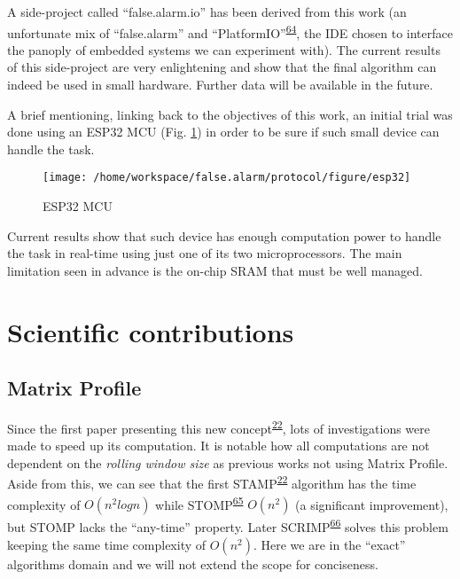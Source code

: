 \documentclass[12pt,twoside]{fmupthesis}
\begin{document}
A side-project called ``false.alarm.io'' has been derived from this work (an unfortunate mix of
``false.alarm'' and ``PlatformIO''\textsuperscript{\protect\hyperlink{ref-PlatformIO}{64}}, the IDE chosen to interface the panoply of embedded
systems we can experiment with). The current results of this side-project are very enlightening and
show that the final algorithm can indeed be used in small hardware. Further data will be available
in the future.

A brief mentioning, linking back to the objectives of this work, an initial trial was done using an
ESP32 MCU (Fig. \ref{fig:esp32}) in order to be sure if such small device can handle the task.
\begin{figure}

{\centering \texttt{[image: /home/workspace/false.alarm/protocol/figure/esp32]} 

}

\caption{ESP32 MCU}\label{fig:esp32}
\end{figure}
Current results show that such device has enough computation power to handle the task in real-time
using just one of its two microprocessors. The main limitation seen in advance is the on-chip SRAM
that must be well managed.

\hypertarget{scientific-contributions}{%
\chapter{Scientific contributions}\label{scientific-contributions}}

\hypertarget{matrix-profile}{%
\section{Matrix Profile}\label{matrix-profile}}

Since the first paper presenting this new concept\textsuperscript{\protect\hyperlink{ref-Yeh2017a}{22}}, lots of investigations were made to
speed up its computation. It is notable how all computations are not dependent on the \emph{rolling
window size} as previous works not using Matrix Profile. Aside from this, we can see that the first
STAMP\textsuperscript{\protect\hyperlink{ref-Yeh2017a}{22}} algorithm has the time complexity of \(O(n^2log{n})\) while STOMP\textsuperscript{\protect\hyperlink{ref-zhu2016}{65}}
\(O(n^2)\) (a significant improvement), but STOMP lacks the ``any-time'' property. Later SCRIMP\textsuperscript{\protect\hyperlink{ref-zhu2018}{66}} solves this problem keeping the same time complexity of \(O(n^2)\). Here we are in the
``exact'' algorithms domain and we will not extend the scope for conciseness.
\end{document}
